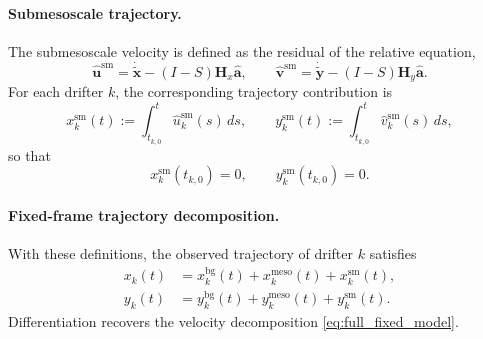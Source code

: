 \documentclass{article}
\begin{document}
\paragraph{Submesoscale trajectory.}
The submesoscale velocity is defined as the residual of the relative equation,
\begin{equation}
\hat{\mathbf{u}}^{\mathrm{sm}}
=
\dot{\tilde{\mathbf{x}}}
-
(I-S)\mathbf{H}_x\hat{\mathbf a},
\qquad
\hat{\mathbf{v}}^{\mathrm{sm}}
=
\dot{\tilde{\mathbf{y}}}
-
(I-S)\mathbf{H}_y\hat{\mathbf a}.
\end{equation}
For each drifter $k$, the corresponding trajectory contribution is
\begin{equation}
x_k^{\mathrm{sm}}(t)
:=
\int_{t_{k,0}}^{t} \hat{u}_k^{\mathrm{sm}}(s)\,ds,
\qquad
y_k^{\mathrm{sm}}(t)
:=
\int_{t_{k,0}}^{t} \hat{v}_k^{\mathrm{sm}}(s)\,ds,
\end{equation}
so that
\begin{equation}
x_k^{\mathrm{sm}}(t_{k,0})=0,
\qquad
y_k^{\mathrm{sm}}(t_{k,0})=0.
\end{equation}

\paragraph{Fixed-frame trajectory decomposition.}
With these definitions, the observed trajectory of drifter $k$ satisfies
\begin{align}
x_k(t)
&= 
x_k^{\mathrm{bg}}(t)
+
x_k^{\mathrm{meso}}(t)
+
x_k^{\mathrm{sm}}(t),
\\
y_k(t)
&=
y_k^{\mathrm{bg}}(t)
+
y_k^{\mathrm{meso}}(t)
+
y_k^{\mathrm{sm}}(t).
\end{align}
Differentiation recovers the velocity decomposition
\eqref{eq:full_fixed_model}.
\end{document}

